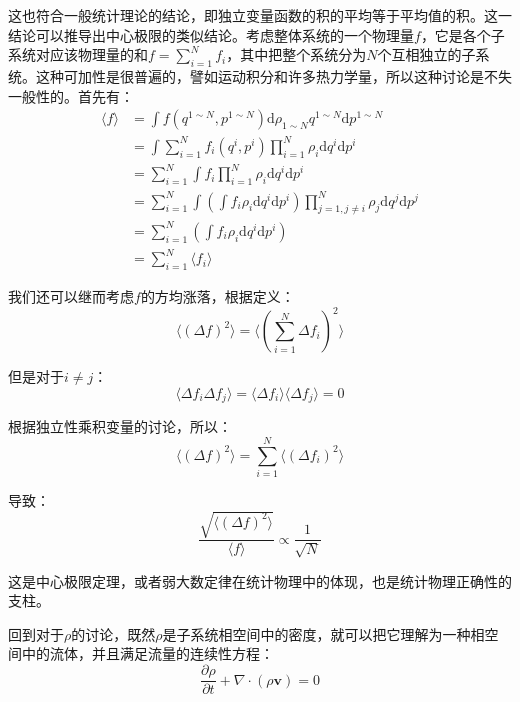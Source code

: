 \documentclass[UTF8]{ctexart}
\begin{document}
\begin{spacing}{2.0}
这也符合一般统计理论的结论，即独立变量函数的积的平均等于平均值的积。这一结论可以推导出中心极限的类似结论。考虑整体系统的一个物理量$f$，它是各个子系统对应该物理量的和$f=\sum_{i=1}^{N}f_{i}$，其中把整个系统分为$N$个互相独立的子系统。这种可加性是很普遍的，譬如运动积分和许多热力学量，所以这种讨论是不失一般性的。首先有：
\begin{equation}
\begin{aligned}
\langle f \rangle &= \int f(q^{1\sim N},p^{1\sim N})\text{d}\rho_{1\sim N}q^{1\sim N}\text{d}p^{1\sim N} \\
&=\int \sum_{i=1}^{N}f_{i}(q^{i},p^{i}) \prod_{i=1}^{N}\rho_{i}\text{d} q^{i}\text{d} p^{i}\\
&=\sum_{i=1}^{N}\int f_{i}\prod_{i=1}^{N}\rho_{i}\text{d} q^{i}\text{d} p^{i}\\
&= \sum_{i=1}^{N}\int(\int f_{i}\rho_{i}\text{d} q^{i}\text{d} p^{i}) \prod_{j=1,j\neq i}^{N}\rho_{j}\text{d} q^{j}\text{d} p^{j}\\
&=\sum_{i=1}^{N}(\int f_{i}\rho_{i}\text{d} q^{i}\text{d} p^{i}) \\
&=\sum_{i=1}^{N}\langle f_{i} \rangle
\end{aligned}
\end{equation}

我们还可以继而考虑$f$的方均涨落，根据定义：
\begin{equation}
\langle (\Delta f)^{2}\rangle =\langle (\sum_{i=1}^{N}\Delta f_{i})^{2} \rangle
\end{equation}

但是对于$i\neq j$：
\begin{equation}
\langle \Delta f_{i}\Delta f_{j} \rangle = \langle \Delta f_{i}\rangle \langle \Delta f_{j}\rangle=0
\end{equation}

根据独立性乘积变量的讨论，所以：
\begin{equation}
\langle (\Delta f)^{2}\rangle =\sum_{i=1}^{N}\langle (\Delta f_{i})^{2} \rangle
\end{equation}

导致：
\begin{equation}
\frac{\sqrt{\langle (\Delta f)^{2}\rangle}}{\langle f\rangle} \propto \frac{1}{\sqrt{N}}
\end{equation}

这是中心极限定理，或者弱大数定律在统计物理中的体现，也是统计物理正确性的支柱。

回到对于$\rho$的讨论，既然$\rho$是子系统相空间中的密度，就可以把它理解为一种相空间中的流体，并且满足流量的连续性方程：
\begin{equation}
\frac{\partial \rho}{\partial t}+\nabla\cdot (\rho \textbf{v}) = 0
\end{equation}


\end{spacing}
\end{document}
